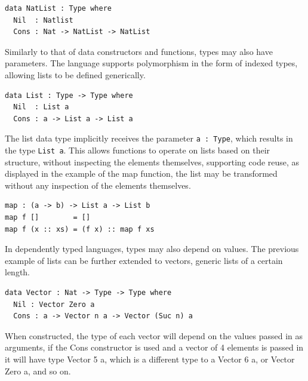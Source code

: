 \documentclass[a4paper]{article}
\begin{document}
\begin{center}
\begin{verbatim}
data NatList : Type where
  Nil  : Natlist
  Cons : Nat -> NatList -> NatList 
\end{verbatim}
\end{center}

Similarly to that of data constructors and functions, types may 
also have parameters. The language supports polymorphism in the form of
indexed types, allowing lists to be defined generically. 

\begin{center}
\begin{verbatim}
data List : Type -> Type where
  Nil  : List a
  Cons : a -> List a -> List a
\end{verbatim}
\end{center}

The list data type implicitly receives the parameter \texttt{a : Type}, which 
results in the type \texttt{List a}. This allows functions to operate on lists
based on their structure, without inspecting the elements themselves,
supporting code reuse, as displayed in the example of the map function, the list may
be transformed without any inspection of the elements themselves.

\begin{center}
\begin{verbatim}
map : (a -> b) -> List a -> List b
map f []        = []
map f (x :: xs) = (f x) :: map f xs
\end{verbatim}
\end{center}

In dependently typed languages, types may also depend on values.
The previous example of lists can be further extended to vectors,
generic lists of a certain length. 

\begin{center}
\begin{verbatim}
data Vector : Nat -> Type -> Type where
  Nil : Vector Zero a
  Cons : a -> Vector n a -> Vector (Suc n) a
\end{verbatim}
\end{center}

When constructed, the type of each vector will depend on the values 
passed in as arguments, if the Cons constructor is used and a vector of 
4 elements is passed in it will have type Vector 5 a, which is a 
different type to a Vector 6 a, or Vector Zero a, and so on. 
\end{document}
